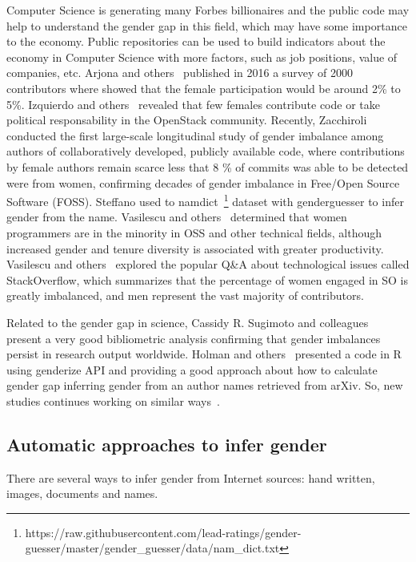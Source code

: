 \documentclass[a4paper]{article}
\begin{document}
Computer Science is generating many Forbes billionaires and the public
code may help to understand the gender gap in this field, which may
have some importance to the economy. Public repositories can
be used to build indicators about the economy in Computer Science with
more factors, such as job positions, value of companies, etc.
Arjona and others~\cite{10.1007/978-3-319-39225-7_13} published in 2016
a survey of 2000 contributors where showed that the female participation would be
around 2\% to 5\%. Izquierdo and others~\cite{izquierdo2018openstack}
revealed that few females contribute code or take political
responsability in the OpenStack community.
Recently, Zacchiroli~\cite{zacchiroli2020gender} conducted the first large-scale
longitudinal study of gender imbalance among authors of
collaboratively developed, publicly available code, where
contributions by female authors remain scarce less that 8 \% of
commits was able to be detected were from women, confirming decades of
gender imbalance in Free/Open Source Software (FOSS). Steffano used
to namdict~\footnote{https://raw.githubusercontent.com/lead-ratings/gender-guesser/master/gender\_guesser/data/nam\_dict.txt} dataset with genderguesser to infer gender from
the name. Vasilescu and others~\cite{vasilescu2015gender} determined
that women programmers are in the minority in OSS and other technical
fields, although increased gender and tenure diversity is associated
with greater productivity. Vasilescu and others~\cite{vasilescu2012gender}
explored the popular Q\&A about technological issues called
StackOverflow, which summarizes that the percentage of women engaged
in SO is greatly imbalanced, and men represent the vast majority of
contributors.

Related to the gender gap in science, Cassidy R. Sugimoto and
colleagues~\cite{lariviere2013bibliometrics}
present a very good bibliometric analysis confirming that gender
imbalances persist in research output worldwide. Holman and
others~\cite{holman2018gender} presented a code in R
using genderize API and providing a good approach
about how to calculate gender gap inferring gender from an author
names retrieved from arXiv. So, new studies continues
working on similar ways~\cite{lockhart2023name}.

\subsection{Automatic approaches to infer gender}

There are several ways to infer gender from Internet
sources: hand written, images, documents and names.
\end{document}
